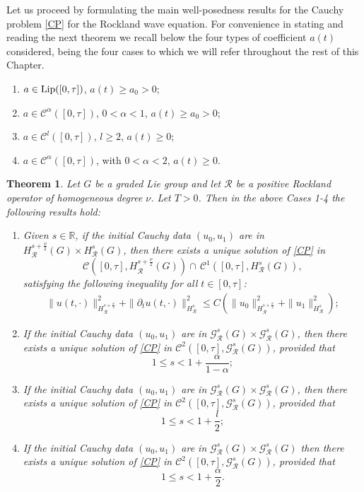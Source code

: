 \documentclass[12pt,oneside,a4paper]{book}
\numberwithin{equation}{section}     %
\theoremstyle{plain}
\newtheorem{theorem}{Theorem}[section]
\theoremstyle{definition}
\newcommand{\R}{{\mathbb R}}
\begin{document}
Let us proceed by formulating the main well-posedness results for the Cauchy problem \eqref{CP} for the Rockland wave equation. For convenience in stating and reading the next theorem we recall below the four types of coefficient $a(t)$ considered, being the four cases to which we will refer throughout the rest of this Chapter.
\begin{enumerate}
	\item $a\in\mathcal {\rm Lip}([0,\tau])$, $a(t)\geq a_0>0$;
	\item $a\in\mathcal C^\alpha([0,\tau])$, $0<\alpha<1$, $a(t)\geq a_0 >0$;
	\item $a\in\mathcal C^l([0,\tau])$, $l \geq 2$, $a(t)\geq 0$;
	\item $a\in\mathcal C^\alpha([0,\tau])$, with $0<\alpha<2$, $a(t)\geq0$.
\end{enumerate}


\begin{theorem}\label{THM:main}
	Let $G$ be a graded Lie group and let $\mathcal R$ be a positive Rockland operator of homogeneous degree $\nu$. 
	Let $T>0$.
	Then in the above Cases 1-4 the following results hold:
	\begin{enumerate}
		\item Given $s\in\R$, if the initial Cauchy data $(u_0,u_1)$ are in $H_\mathcal R^{s+\frac{\nu}{2}}(G)\times H_\mathcal R^s(G)$, then there exists a unique solution of \eqref{CP} in 
		$$\mathcal C\left([0,\tau],H_\mathcal R^{s+\frac{\nu}{2}}(G)\right)\cap\,\mathcal C^1([0,\tau],H_\mathcal R^s(G)),$$
		satisfying the following inequality for all $t\in [0,\tau]$:
		\begin{align}\label{inequality case 1}
		\|u(t,\cdot)\|^2_{H_{\mathcal R}^{s+\frac{\nu}{2}}}+\|\partial_t u(t,\cdot)\|^2_{H_{\mathcal R}^{s}}\leq C(\|u_0\|^2_{H_{\mathcal R}^{s+\frac{\nu}{2}}}+\|u_1\|^2_{H_{\mathcal R}^{s}});
		\end{align}
		
		\item If the initial Cauchy data $(u_0, u_1)$ are in $\mathcal G^s_\mathcal R(G)\times \mathcal G^s_\mathcal R(G)$, then there exists a unique solution of \eqref{CP} in $\mathcal C^2([0,\tau],\mathcal G_\mathcal R^s(G))$, provided that
		\[
		1\leq s <1 +\frac{\alpha}{1-\alpha};
		\]
		
		\item If the initial Cauchy data $(u_0, u_1)$ are in $\mathcal G^s_\mathcal R(G)\times \mathcal G^s_\mathcal R(G)$, then there exists a unique solution of \eqref{CP} in $\mathcal C^2([0,\tau],\mathcal G_\mathcal R^s(G))$, provided that
		\[
		1\leq s <1 +\frac{l}{2};
		\]
		
		\item If the initial Cauchy data $(u_0, u_1)$ are in $\mathcal G^s_\mathcal R(G)\times \mathcal G^s_\mathcal R(G)$ then there exists a unique solution of \eqref{CP} in $\mathcal C^2([0,\tau],\mathcal G_\mathcal R^s(G))$, provided that
		\[
		1\leq s <1 +\frac{\alpha}{2}. 
		\]
	\end{enumerate}
\end{theorem}
\end{document}

